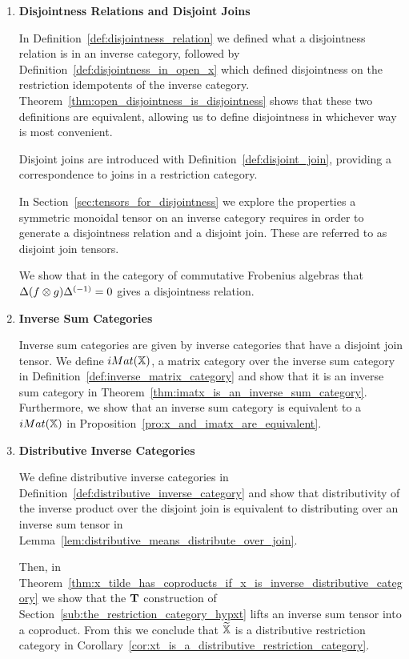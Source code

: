 \begin{enumerate}
\item \textbf{Disjointness Relations and Disjoint Joins}

In Definition~\ref{def:disjointness_relation} we defined what a disjointness relation is in an
inverse category, followed by Definition~\ref{def:disjointness_in_open_x} which defined disjointness
on the restriction idempotents of the inverse
category. Theorem~\ref{thm:open_disjointness_is_disjointness} shows that these two definitions are
equivalent, allowing us to define disjointness in whichever way is most convenient.

Disjoint joins are introduced with Definition~\ref{def:disjoint_join}, providing a correspondence to
joins in a restriction category.

In Section~\ref{sec:tensors_for_disjointness} we explore the properties a symmetric monoidal tensor
on an inverse category requires in order to generate a disjointness relation and a disjoint
join. These are referred to as disjoint join tensors.

We show that in the category of commutative Frobenius algebras that $\Delta(f\otimes g){\Delta}^{(-1)} = 0$
gives a disjointness relation.

\item \textbf{Inverse Sum Categories}

Inverse sum categories are given by inverse categories that have a disjoint join tensor. We define
$iMat({\mathbb{X}})$, a matrix category over the inverse sum category \X in
Definition~\ref{def:inverse_matrix_category} and show that it is an inverse sum category in
Theorem~\ref{thm:imatx_is_an_inverse_sum_category}. Furthermore, we show
that an inverse sum category \X is equivalent to a $iMat({\mathbb{X}})$ in
Proposition~\ref{pro:x_and_imatx_are_equivalent}.


\item \textbf{Distributive Inverse Categories}

We define distributive inverse categories in Definition~\ref{def:distributive_inverse_category} and
show that distributivity of the inverse product over the disjoint join is equivalent to distributing
over an inverse sum tensor in Lemma~\ref{lem:distributive_means_distribute_over_join}.

Then, in Theorem~\ref{thm:x_tilde_has_coproducts_if_x_is_inverse_distributive_category} we show that
the $\mathbf{T}$ construction of Section~\ref{sub:the_restriction_category_hypxt} lifts an inverse sum
tensor into a coproduct. From this we conclude that $\widetilde{\mathbb{X}}$ is a distributive restriction category in
Corollary~\ref{cor:xt_is_a_distributive_restriction_category}.
\end{enumerate}

